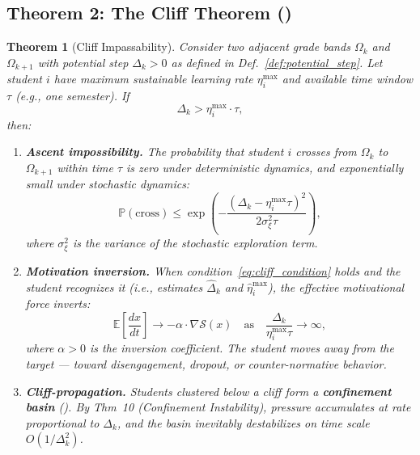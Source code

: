 \documentclass[11pt,a4paper]{article}
\newtheorem{theorem}{Theorem}[section]
\newcommand{\E}{\mathbb{E}}
\newcommand{\Pbb}{\mathbb{P}}
\newcommand{\gradS}{\nabla\mathcal{S}}
\begin{document}
\subsection{Theorem 2: The Cliff Theorem ()}
\begin{theorem}[Cliff Impassability]
\label{thm:cliff}
Consider two adjacent grade bands $\Omega_k$ and $\Omega_{k+1}$ with potential step $\Delta_k > 0$ as defined in Def.~\ref{def:potential_step}. Let student $i$ have maximum sustainable learning rate $\eta_i^{\max}$ and available time window $\tau$ (e.g., one semester). If
\begin{equation}
    \Delta_k > \eta_i^{\max} \cdot \tau,
    \label{eq:cliff_condition}
\end{equation}
then:
\begin{enumerate}[label=(\roman*)]
    \item \textbf{Ascent impossibility.} The probability that student $i$ crosses from $\Omega_k$ to $\Omega_{k+1}$ within time $\tau$ is zero under deterministic dynamics, and exponentially small under stochastic dynamics:
    \begin{equation}
        \Pbb(\text{cross}) \leq \exp\left(-\frac{(\Delta_k - \eta_i^{\max}\tau)^2}{2\sigma_\xi^2 \tau}\right),
    \end{equation}
    where $\sigma_\xi^2$ is the variance of the stochastic exploration term.
    \item \textbf{Motivation inversion.} When condition~\eqref{eq:cliff_condition} holds and the student recognizes it (i.e., estimates $\hat{\Delta}_k$ and $\hat{\eta}_i^{\max}$), the effective motivational force inverts:
    \begin{equation}
        \E\left[\frac{dx}{dt}\right] \to -\alpha \cdot \gradS(x) \quad \text{as} \quad \frac{\Delta_k}{\eta_i^{\max}\tau} \to \infty,
    \end{equation}
    where $\alpha > 0$ is the inversion coefficient. The student moves \textit{away} from the target — toward disengagement, dropout, or counter-normative behavior.
    \item \textbf{Cliff-propagation.} Students clustered below a cliff form a \textbf{confinement basin} (). By Thm~10 (Confinement Instability), pressure accumulates at rate proportional to $\Delta_k$, and the basin inevitably destabilizes on time scale $O(1/\Delta_k^2)$.
\end{enumerate}
\end{theorem}
\end{document}
